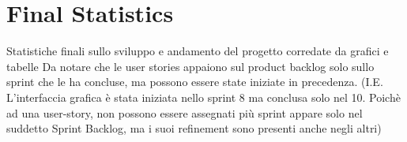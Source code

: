 \chapter{Final Statistics}
Statistiche finali sullo sviluppo e andamento del progetto corredate da grafici e tabelle
Da notare che le user stories appaiono sul product backlog solo sullo sprint che le ha concluse, ma possono essere state iniziate in precedenza. (I.E. L'interfaccia grafica è stata iniziata nello sprint 8 ma conclusa solo nel 10. Poichè ad una user-story, non possono essere assegnati più sprint appare solo nel suddetto Sprint Backlog, ma i suoi refinement sono presenti anche negli altri)